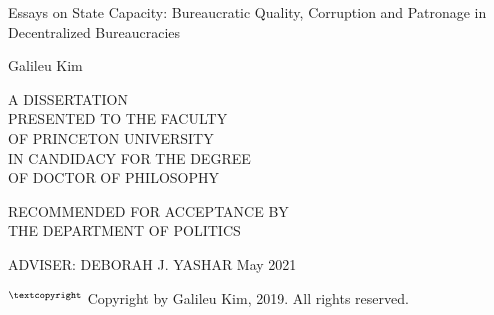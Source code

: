 \documentclass[12pt]{report}
\theoremstyle{definition}
\begin{document}
\begin{titlepage}
    \begin{center}
        \vspace*{6cm}
        
        \huge
        Essays on State Capacity: Bureaucratic Quality, Corruption and Patronage in Decentralized Bureaucracies
 
             
        \vspace{1.5cm}
        
        \LARGE
        Galileu Kim
 
        \vspace{3cm}
                
        \normalsize
        A DISSERTATION\\
        PRESENTED TO THE FACULTY\\
        OF PRINCETON UNIVERSITY\\
        IN CANDIDACY FOR THE DEGREE\\
        OF DOCTOR OF PHILOSOPHY
        
        \vspace{1cm}
        
        RECOMMENDED FOR ACCEPTANCE BY\\
        THE DEPARTMENT OF POLITICS

        \vspace{1cm}

        ADVISER: DEBORAH J. YASHAR
        \vfill
        \Large
        May 2021
    \end{center}
\end{titlepage}

\newpage


\newpage


\begin{center}
    $^{\textcopyright}$ Copyright by Galileu Kim, 2019. All rights reserved.
\end{center}
\end{document}
